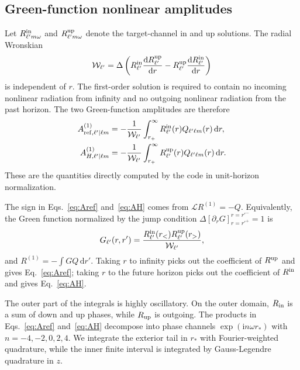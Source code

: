 \documentclass[aps,prd,twocolumn,nofootinbib,superscriptaddress,10pt,floatfix]{revtex4-2}
\newcommand{\ii}{\mathrm{i}}
\newcommand{\dd}{\mathrm{d}}
\newcommand{\rp}{r_+}
\newcommand{\W}{\mathcal{W}}
\begin{document}
\subsection{Green-function nonlinear amplitudes}

Let $R_{\ell'm\omega}^{\rm in}$ and $R_{\ell'm\omega}^{\rm up}$ denote the
target-channel in and up solutions.  The radial Wronskian
\begin{equation}
\W_{\ell'}=
\Delta
\left(
R_{\ell'}^{\rm in}\frac{\dd R_{\ell'}^{\rm up}}{\dd r}
-
R_{\ell'}^{\rm up}\frac{\dd R_{\ell'}^{\rm in}}{\dd r}
\right)
\label{eq:W}
\end{equation}
is independent of $r$.  The first-order solution is required to contain no
incoming nonlinear radiation from infinity and no outgoing nonlinear radiation
from the past horizon.  The two Green-function amplitudes are therefore
\begin{align}
A_{{\rm ref},\ell'|\ell m}^{(1)}
&=
-\frac{1}{\W_{\ell'}}
\int_{\rp}^{\infty}
R_{\ell'}^{\rm in}(r) Q_{\ell'\ell m}(r)\,\dd r,
\label{eq:Aref}\\
A_{H,\ell'|\ell m}^{(1)}
&=
-\frac{1}{\W_{\ell'}}
\int_{\rp}^{\infty}
R_{\ell'}^{\rm up}(r) Q_{\ell'\ell m}(r)\,\dd r.
\label{eq:AH}
\end{align}
These are the quantities directly computed by the code in unit-horizon
normalization.

The sign in Eqs.~\eqref{eq:Aref} and~\eqref{eq:AH} comes from
$\mathcal{L}R^{(1)}=-Q$.  Equivalently, the Green function normalized by the
jump condition
$\Delta[\partial_rG]_{r=r'^{+}}^{r=r'^{-}}=1$ is
\begin{equation}
G_{\ell'}(r,r')
=
\frac{
R_{\ell'}^{\rm in}(r_<)R_{\ell'}^{\rm up}(r_>)
}{\W_{\ell'}},
\label{eq:green}
\end{equation}
and $R^{(1)}=-\int GQ\,\dd r'$.  Taking $r$ to infinity picks out the
coefficient of $R^{\rm up}$ and gives Eq.~\eqref{eq:Aref}; taking $r$ to the
future horizon picks out the coefficient of $R^{\rm in}$ and gives
Eq.~\eqref{eq:AH}.

The outer part of the integrals is highly oscillatory.  On the outer domain,
$R_{\rm in}$ is a sum of down and up phases, while $R_{\rm up}$ is outgoing.
The products in Eqs.~\eqref{eq:Aref} and~\eqref{eq:AH} decompose into
phase channels $\exp(\ii n\omega r_*)$ with $n=-4,-2,0,2,4$.  We integrate
the exterior tail in $r_*$ with Fourier-weighted quadrature, while the inner
finite interval is integrated by Gauss-Legendre quadrature in $z$.
\end{document}
